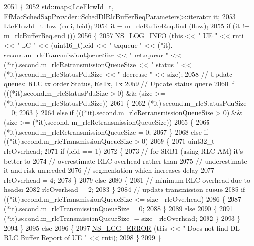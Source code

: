 \begin{DoxyCode}
2051 \{
2052   std::map<LteFlowId\_t, FfMacSchedSapProvider::SchedDlRlcBufferReqParameters>::iterator it;
2053   LteFlowId\_t flow (rnti, lcid);
2054   it = \hyperlink{classns3_1_1FdMtFfMacScheduler_ae9400017a91705970fdac7566ae54374}{m\_rlcBufferReq}.find (flow);
2055   \textcolor{keywordflow}{if} (it != \hyperlink{classns3_1_1FdMtFfMacScheduler_ae9400017a91705970fdac7566ae54374}{m\_rlcBufferReq}.end ())
2056     \{
2057       \hyperlink{group__logging_gafbd73ee2cf9f26b319f49086d8e860fb}{NS\_LOG\_INFO} (\textcolor{keyword}{this} << \textcolor{stringliteral}{" UE "} << rnti << \textcolor{stringliteral}{" LC "} << (uint16\_t)lcid << \textcolor{stringliteral}{" txqueue "} << (*it).
      second.m\_rlcTransmissionQueueSize << \textcolor{stringliteral}{" retxqueue "} << (*it).second.m\_rlcRetransmissionQueueSize << \textcolor{stringliteral}{" status "} 
      << (*it).second.m\_rlcStatusPduSize << \textcolor{stringliteral}{" decrease "} << size);
2058       \textcolor{comment}{// Update queues: RLC tx order Status, ReTx, Tx}
2059       \textcolor{comment}{// Update status queue}
2060       \textcolor{keywordflow}{if} (((*it).second.m\_rlcStatusPduSize > 0) && (size >= (*it).second.m\_rlcStatusPduSize))
2061         \{
2062            (*it).second.m\_rlcStatusPduSize = 0;
2063         \}
2064       \textcolor{keywordflow}{else} \textcolor{keywordflow}{if} (((*it).second.m\_rlcRetransmissionQueueSize > 0) && (size >= (*it).second.
      m\_rlcRetransmissionQueueSize))
2065         \{
2066           (*it).second.m\_rlcRetransmissionQueueSize = 0;
2067         \}
2068       \textcolor{keywordflow}{else} \textcolor{keywordflow}{if} ((*it).second.m\_rlcTransmissionQueueSize > 0)
2069         \{
2070           uint32\_t rlcOverhead;
2071           \textcolor{keywordflow}{if} (lcid == 1)
2072             \{
2073               \textcolor{comment}{// for SRB1 (using RLC AM) it's better to}
2074               \textcolor{comment}{// overestimate RLC overhead rather than}
2075               \textcolor{comment}{// underestimate it and risk unneeded}
2076               \textcolor{comment}{// segmentation which increases delay }
2077               rlcOverhead = 4;                                  
2078             \}
2079           \textcolor{keywordflow}{else}
2080             \{
2081               \textcolor{comment}{// minimum RLC overhead due to header}
2082               rlcOverhead = 2;
2083             \}
2084           \textcolor{comment}{// update transmission queue}
2085           \textcolor{keywordflow}{if} ((*it).second.m\_rlcTransmissionQueueSize <= size - rlcOverhead)
2086             \{
2087               (*it).second.m\_rlcTransmissionQueueSize = 0;
2088             \}
2089           \textcolor{keywordflow}{else}
2090             \{                    
2091               (*it).second.m\_rlcTransmissionQueueSize -= size - rlcOverhead;
2092             \}
2093         \}
2094     \}
2095   \textcolor{keywordflow}{else}
2096     \{
2097       \hyperlink{group__logging_ga0261a8db1d4ac5f79417d117634fd455}{NS\_LOG\_ERROR} (\textcolor{keyword}{this} << \textcolor{stringliteral}{" Does not find DL RLC Buffer Report of UE "} << rnti);
2098     \}
2099 \}
\end{DoxyCode}



